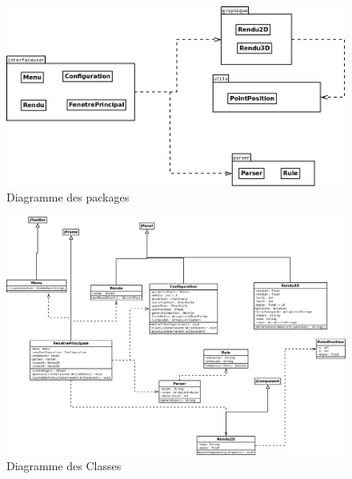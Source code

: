 \newpage
\begin{figure}[t]
		\centering
		\includegraphics[width=16cm]{images/package.png}
	    \caption{Diagramme des packages }
\end{figure}
\begin{figure}[h]
		\centering
		\includegraphics[width=18cm]{images/classe.png}
	    \caption{Diagramme des Classes }
\end{figure}
